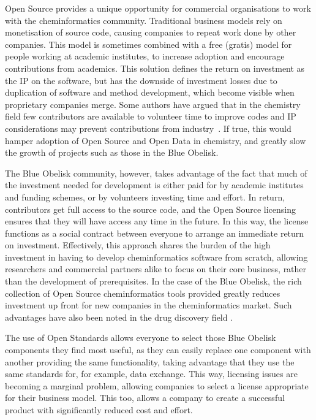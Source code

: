 \documentclass[10pt]{bmc_article}
\newenvironment{bmcformat}{\fussy\setboolean{publ}{true}}{\fussy}
\begin{document}
\begin{bmcformat}
Open Source provides a unique opportunity for commercial organisations to work with the
cheminformatics community. Traditional business models rely on monetisation of source
code, causing companies to repeat work done by other companies. This
model is sometimes combined
with a free (gratis) model for people working at academic institutes, to increase adoption
and encourage contributions from academics. This solution defines the return on investment as the IP on the software,
but has the downside of investment losses due to duplication of
software and method development, which become visible when proprietary companies
merge. Some authors have argued that in the chemistry field
few contributors are available to volunteer time
to improve codes and IP considerations may prevent contributions from
industry~\cite{Stahl:2005fk}. If true, this would hamper
adoption of Open Source and Open Data in chemistry, and greatly slow
the growth of projects such as those in the Blue Obelisk.

The Blue Obelisk community, however, takes advantage of the fact that much of the investment needed
for development is either paid for by academic institutes and funding
schemes, or by
volunteers investing time and effort. In return, contributors get full
access to the source code, and the Open Source licensing ensures
that they will have access any time in the future. In this way, the
license functions as a social
contract between everyone to arrange an immediate return on investment. Effectively,
this approach shares the burden of the high investment in having to develop cheminformatics
software from scratch, allowing researchers and commercial partners alike to focus
on their core business, rather than the development of prerequisites.
In the case of the Blue Obelisk, the rich
collection of Open Source cheminformatics tools provided
greatly reduces investment up front for new companies in the
cheminformatics market. Such advantages have also been noted in the
drug discovery
field \cite{DeLano:2005uq, Munos:2006vn, Geldenhuys:2006kx}.

The use of Open Standards allows everyone to select those Blue Obelisk components
they find most useful, as they can easily replace one component with another providing
the same functionality, taking advantage that they use the same standards for,
for example, data exchange. This way, licensing issues are becoming a marginal
problem, allowing companies to select a license appropriate for their business
model. This too, allows a company to create a successful product with significantly
reduced cost and effort.


\end{bmcformat}
\end{document}
